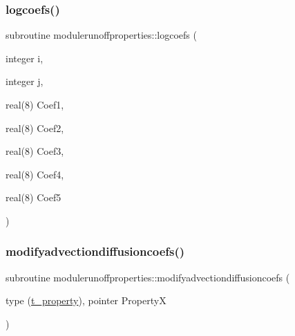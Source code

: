 \subsubsection{\texorpdfstring{logcoefs()}{logcoefs()}}
{\footnotesize\ttfamily subroutine modulerunoffproperties\+::logcoefs (\begin{DoxyParamCaption}\item[{integer}]{i,  }\item[{integer}]{j,  }\item[{real(8)}]{Coef1,  }\item[{real(8)}]{Coef2,  }\item[{real(8)}]{Coef3,  }\item[{real(8)}]{Coef4,  }\item[{real(8)}]{Coef5 }\end{DoxyParamCaption})\hspace{0.3cm}{\ttfamily [private]}}

\mbox{\label{namespacemodulerunoffproperties_ae48417d5192871ed023a556976f13a89}} 
\subsubsection{\texorpdfstring{modifyadvectiondiffusioncoefs()}{modifyadvectiondiffusioncoefs()}}
{\footnotesize\ttfamily subroutine modulerunoffproperties\+::modifyadvectiondiffusioncoefs (\begin{DoxyParamCaption}\item[{type (\mbox{\hyperlink{structmodulerunoffproperties_1_1t__property}{t\+\_\+property}}), pointer}]{PropertyX }\end{DoxyParamCaption})\hspace{0.3cm}{\ttfamily [private]}}

